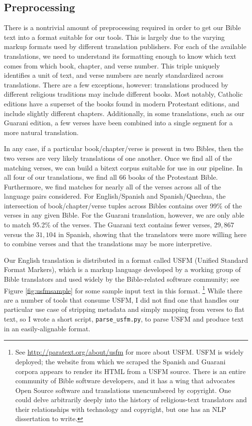 \subsection{Preprocessing}
There is a nontrivial amount of preprocessing required in order to get our
Bible text into a format suitable for our tools.  This is largely due to the
varying markup formats used by different translation publishers.
For each of the available translations, we need to understand its formatting
enough to know which text comes from which book, chapter, and verse number.
This triple uniquely identifies a unit of text, and verse numbers are nearly
standardized across translations.  There are a few exceptions, however:
translations produced by different religious traditions may include different
books. Most notably, Catholic editions have a superset of the books found in
modern Protestant editions, and include slightly different chapters.
Additionally, in some translations, such as our Guarani edition, a few verses
have been combined into a single segment for a more natural translation.

In any case, if a particular book/chapter/verse is present in two Bibles, then
the two verses are very likely translations of one another. Once we find all of
the matching verses, we can build a bitext corpus suitable for use in our
pipeline.  In all four of our translations, we find all 66 books of the
Protestant Bible. Furthermore, we find matches for nearly all of the verses
across all of the language pairs considered. For English/Spanish and
Spanish/Quechua, the intersection of book/chapter/verse tuples across Bibles
contains over 99\% of the verses in any given Bible. For the Guarani
translation, however, we are only able to match 95.2\% of the verses. The
Guarani text contains fewer verses, $29,867$ versus the $31,104$ in Spanish,
showing that the translators were more willing here to combine verses and that
the translations may be more interpretive.

Our English translation is distributed in a format called USFM (Unified
Standard Format Markers), which is a markup language developed by a working
group of Bible translators and used widely by the Bible-related software
community; see Figure \ref{fig:usfmsample} for some sample input text in this
format.
\footnote{See \url{http://paratext.org/about/usfm} for more about USFM. USFM is
widely deployed; the website from which we scraped the Spanish and Guarani
corpora appears to render its HTML from a USFM source.  There is an entire
community of Bible software developers, and it has a wing that advocates Open
Source software and translations unencumbered by copyright.  One could delve
arbitrarily deeply into the history of religious-text translators and their
relationships with technology and copyright, but one has an NLP dissertation to
write.}
While there are a number of tools that consume USFM, I did not find one that
handles our particular use case of stripping metadata and simply mapping from
verses to flat text, so I wrote a short script, \texttt{parse\_usfm.py}, to
parse USFM and produce text in an easily-alignable format.


